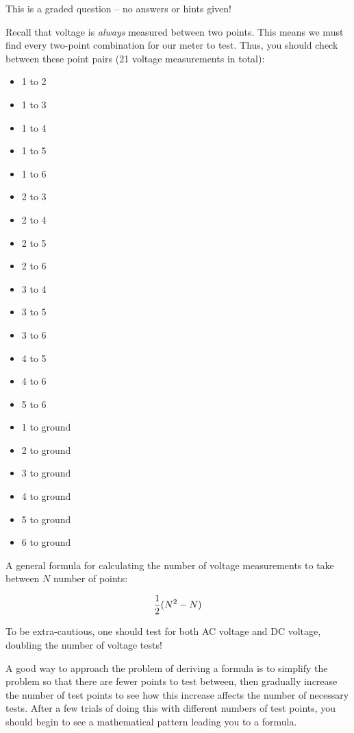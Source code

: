 This is a graded question -- no answers or hints given!







Recall that voltage is {\it always} measured between two points.  This means we must find every two-point combination for our meter to test.  Thus, you should check between these point pairs (21 voltage measurements in total):

\begin{itemize}
\item{} 1 to 2
\item{} 1 to 3
\item{} 1 to 4
\item{} 1 to 5
\item{} 1 to 6
\item{} 2 to 3
\item{} 2 to 4
\item{} 2 to 5
\item{} 2 to 6
\item{} 3 to 4
\item{} 3 to 5
\item{} 3 to 6
\item{} 4 to 5
\item{} 4 to 6
\item{} 5 to 6
\item{} 1 to ground
\item{} 2 to ground
\item{} 3 to ground
\item{} 4 to ground
\item{} 5 to ground
\item{} 6 to ground
\end{itemize}

A general formula for calculating the number of voltage measurements to take between $N$ number of points:

$${1 \over 2}(N^2 - N)$$

\vskip 10pt

To be extra-cautious, one should test for both AC voltage and DC voltage, doubling the number of voltage tests!

\vskip 10pt

A good way to approach the problem of deriving a formula is to simplify the problem so that there are fewer points to test between, then gradually increase the number of test points to see how this increase affects the number of necessary tests.  After a few trials of doing this with different numbers of test points, you should begin to see a mathematical pattern leading you to a formula.


